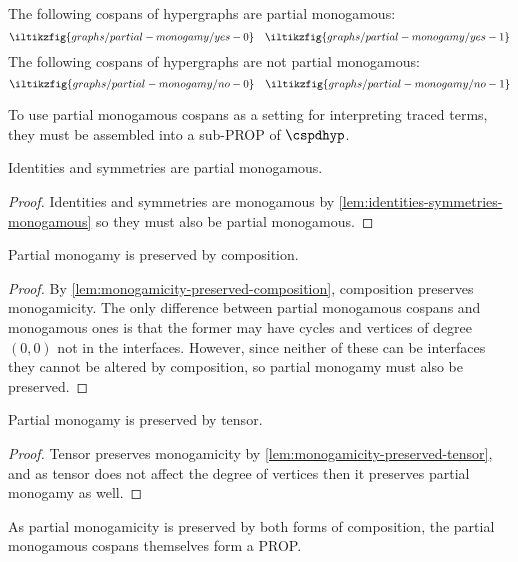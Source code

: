 \begin{example}\label{ex:partial-monogamous}
    The following cospans of hypergraphs are partial monogamous:
    \[
        \iltikzfig{graphs/partial-monogamy/yes-0}
        \quad
        \iltikzfig{graphs/partial-monogamy/yes-1}
    \]
    The following cospans of hypergraphs are not partial monogamous:
    \[
        \iltikzfig{graphs/partial-monogamy/no-0}
        \quad
        \iltikzfig{graphs/partial-monogamy/no-1}
    \]
\end{example}

To use partial monogamous cospans as a setting for interpreting traced terms,
they must be assembled into a sub-PROP of \(\cspdhyp\).

\begin{lemma}\label{lem:identities-symmetries-partial-monogamous}
    Identities and symmetries are partial monogamous.
\end{lemma}
\begin{proof}
    Identities and symmetries are monogamous by
    \cref{lem:identities-symmetries-monogamous} so they must also be partial
    monogamous.
\end{proof}

\begin{lemma}\label{lem:partial-monogamicity-preserved-composition}
    Partial monogamy is preserved by composition.
\end{lemma}
\begin{proof}
    By \cref{lem:monogamicity-preserved-composition}, composition preserves
    monogamicity.
    The only difference between partial monogamous cospans and monogamous ones
    is that the former may have cycles and vertices of degree \((0,0)\) not in the
    interfaces.
    However, since neither of these can be interfaces they cannot be altered by
    composition, so partial monogamy must also be preserved.
\end{proof}

\begin{lemma}\label{lem:partial-monogamicity-preserved-tensor}
    Partial monogamy is preserved by tensor.
\end{lemma}
\begin{proof}
    Tensor preserves monogamicity by
    \cref{lem:monogamicity-preserved-tensor}, and as tensor does not affect the
    degree of vertices then it preserves partial monogamy as well.
\end{proof}

As partial monogamicity is preserved by both forms of composition, the
partial monogamous cospans themselves form a PROP.

